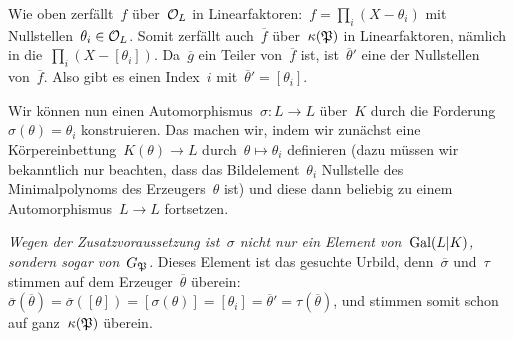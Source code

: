 \documentclass[8pt]{uebblatt}
\newcommand{\ov}[1]{\overline{#1}}
\begin{document}
Wie oben zerfällt~$f$ über~$\mathcal{O}_L$ in Linearfaktoren:~$f = \prod_i (X -
\theta_i)$ mit Nullstellen~$\theta_i \in \mathcal{O}_L$. Somit zerfällt auch~$\ov f$
über~$\kappa(\mathfrak{P})$ in Linearfaktoren, nämlich in die~$\prod_i (X -
[\theta_i])$. Da~$\ov g$ ein Teiler von~$\ov f$ ist, ist~$\ov\theta'$ eine der
Nullstellen von~$\ov f$. Also gibt es einen Index~$i$ mit~$\ov\theta' =
[\theta_i]$.

Wir können nun einen Automorphismus~$\sigma : L \to L$ über~$K$ durch die
Forderung~$\sigma(\theta) = \theta_i$ konstruieren. Das machen wir, indem wir
zunächst eine Körpereinbettung~$K(\theta) \to L$ durch~$\theta \mapsto
\theta_i$ definieren (dazu müssen wir bekanntlich nur beachten, dass das
Bildelement~$\theta_i$ Nullstelle des Minimalpolynoms des Erzeugers~$\theta$
ist) und diese dann beliebig zu einem Automorphismus~$L \to L$ fortsetzen.

\emph{Wegen der Zusatzvoraussetzung ist~$\sigma$ nicht nur ein Element
von~$\mathrm{Gal}(L|K)$, sondern sogar von~$G_{\mathfrak{P}}$.} Dieses Element ist das gesuchte
Urbild, denn~$\ov\sigma$ und~$\tau$ stimmen auf dem Erzeuger~$\ov\theta$
überein: $\ov\sigma(\ov\theta) = \ov\sigma([\theta]) = [\sigma(\theta)] =
[\theta_i] = \ov\theta' = \tau(\ov\theta)$, und stimmen somit schon auf
ganz~$\kappa(\mathfrak{P})$ überein.
\end{document}
